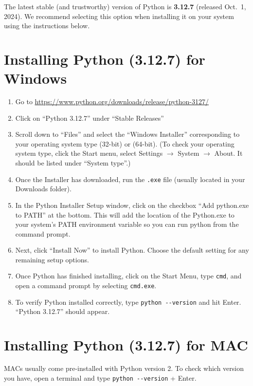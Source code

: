 \documentclass{UNB-Physics-Assignment}
\begin{document}
The latest stable (and trustworthy) version of Python is \textbf{3.12.7} (released Oct.~1, 2024). We recommend selecting this option when installing it on your system using the instructions below.

\section*{Installing Python (3.12.7) for Windows}

\begin{enumerate}
  \item Go to \href{https://www.python.org/downloads/release/python-3127/}{https://www.python.org/downloads/release/python-3127/}
  \item Click on ``Python 3.12.7'' under ``Stable Releases''
  \item Scroll down to ``Files'' and select the ``Windows Installer'' corresponding to your operating system type (32-bit) or (64-bit).
  (To check your operating system type, click the Start menu, select Settings $\to$ System $\to$ About. It should be listed under ``System type''.)
  \item Once the Installer has downloaded, run the \verb".exe" file (usually located in your Downloads folder).
  \item In the Python Installer Setup window, click on the checkbox ``Add python.exe to PATH'' at the bottom.
  This will add the location of the Python.exe to your system's PATH environment variable so you can run python from the command prompt.
  \item Next, click ``Install Now'' to install Python. Choose the default setting for any remaining setup options.
  \item Once Python has finished installing, click on the Start Menu, type \verb"cmd", and open a command prompt by selecting \verb"cmd.exe".
  \item To verify Python installed correctly, type \verb"python --version" and hit Enter. ``Python 3.12.7'' should appear.
\end{enumerate}

\section*{Installing Python (3.12.7) for MAC}

MACs usually come pre-installed with Python version 2. To check which version you have, open a terminal and type \verb"python --version" + Enter.
\end{document}
